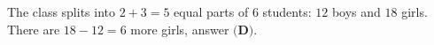 The class splits into $2+3=5$ equal parts of $6$ students: $12$ boys and $18$ girls. There are $18-12=\boxed{6}$ more girls, answer $\textbf{(D)}$.
